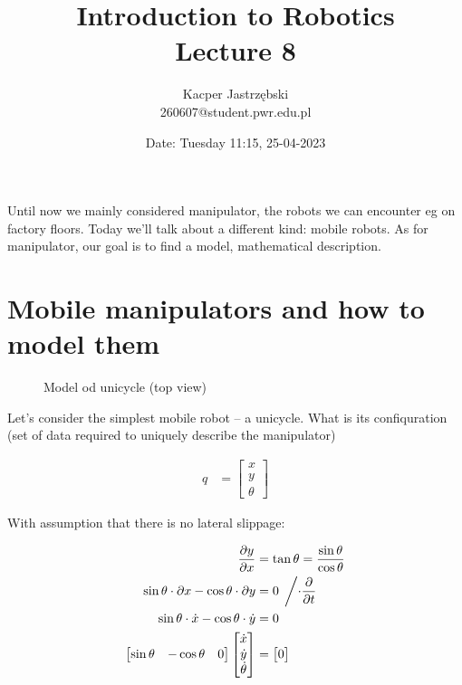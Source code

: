 \documentclass[12pt, a4paper]{extarticle}
\title{
	Introduction to Robotics \\
	\vspace{\baselineskip}
	\large
	\textbf{Lecture 8}
}
\author{
	Kacper Jastrzębski\\
	260607@student.pwr.edu.pl
}
\date{Date: Tuesday 11:15, 25-04-2023}
\begin{document}
	\maketitle
	\vspace{1.5cm}

	\tableofcontents

	\pagebreak

	Until now we mainly considered manipulator, the robots we can encounter eg on factory floors. Today we'll talk about a different kind: mobile robots. As for manipulator, our goal is to find a model, mathematical description.

	\section{Mobile manipulators and how to model them}
	\begin{figure}[H]
		\centering
		\caption{Model od unicycle (top view)}
	\end{figure}


	Let's consider the simplest mobile robot -- a unicycle. What is its confiquration (set of data required to uniquely describe the manipulator)

	\begin{align}
		q &= \begin{bmatrix}
			x \\
			y \\
			\theta
		\end{bmatrix}
	\end{align}

	With assumption that there is no lateral slippage:

	\begin{align}
		\dfrac{\partial y}{\partial x} &= \tan \theta = \dfrac{\sin \theta}{\cos \theta} \\
		\sin \theta \cdot \partial x - \cos \theta \cdot \partial y &= 0 \; \left/ \cdot \dfrac{\partial}{\partial t} \right. \\
		\sin \theta \cdot \dot{x} - \cos \theta \cdot \dot{y} &= 0 \\
		\begin{bmatrix}
			\sin \theta & -\cos \theta & 0
		\end{bmatrix}
		\begin{bmatrix}
			\dot{x} \\
			\dot{y} \\
			\dot{\theta}
		\end{bmatrix} &= \begin{bmatrix}
		0
	\end{bmatrix}
	\end{align}
\end{document}
